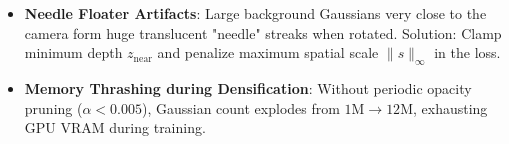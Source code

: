 \begin{trap}
\begin{itemize}
\item \textbf{Needle Floater Artifacts}: Large background Gaussians very close to the camera form huge translucent "needle" streaks when rotated. Solution: Clamp minimum depth $z_{\text{near}}$ and penalize maximum spatial scale $\|s\|_\infty$ in the loss.
\item \textbf{Memory Thrashing during Densification}: Without periodic opacity pruning ($\alpha < 0.005$), Gaussian count explodes from $1\text{M} \to 12\text{M}$, exhausting GPU VRAM during training.
\end{itemize}
\end{trap}
